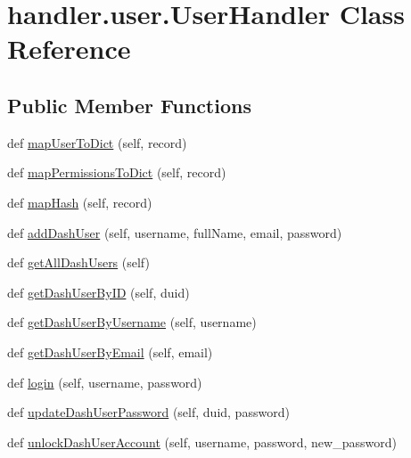 \hypertarget{classhandler_1_1user_1_1_user_handler}{}\section{handler.\+user.\+User\+Handler Class Reference}
\label{classhandler_1_1user_1_1_user_handler}
\subsection*{Public Member Functions}
\begin{DoxyCompactItemize}
\item 
def \hyperlink{classhandler_1_1user_1_1_user_handler_a563bf510a65aefcc2d6988d18fce087f}{map\+User\+To\+Dict} (self, record)
\item 
def \hyperlink{classhandler_1_1user_1_1_user_handler_a68a4fcf8939d84849aa4b6bb63d25a65}{map\+Permissions\+To\+Dict} (self, record)
\item 
def \hyperlink{classhandler_1_1user_1_1_user_handler_a6bebccaf5fa86ff02d81c65bff29ec87}{map\+Hash} (self, record)
\item 
def \hyperlink{classhandler_1_1user_1_1_user_handler_a3d1e4cb462752aa66af5950b89c1feed}{add\+Dash\+User} (self, username, full\+Name, email, password)
\item 
def \hyperlink{classhandler_1_1user_1_1_user_handler_a7fcf1c2f61bb89c83536a0066d089de1}{get\+All\+Dash\+Users} (self)
\item 
def \hyperlink{classhandler_1_1user_1_1_user_handler_a8496fb014da7425079e6a2c02a5b6af6}{get\+Dash\+User\+By\+ID} (self, duid)
\item 
def \hyperlink{classhandler_1_1user_1_1_user_handler_a70ef6b477b3320b72ffdd736df0f0f96}{get\+Dash\+User\+By\+Username} (self, username)
\item 
def \hyperlink{classhandler_1_1user_1_1_user_handler_ae8de510893a8c86cc173b55739143368}{get\+Dash\+User\+By\+Email} (self, email)
\item 
def \hyperlink{classhandler_1_1user_1_1_user_handler_a83f742752a1b3d3bbf68c3cabc877f3c}{login} (self, username, password)
\item 
def \hyperlink{classhandler_1_1user_1_1_user_handler_a56eaeae0434a67f7d99f4d7c670afdc9}{update\+Dash\+User\+Password} (self, duid, password)
\item 
def \hyperlink{classhandler_1_1user_1_1_user_handler_aa2de9a5da6421296215e75fafeb9b9d4}{unlock\+Dash\+User\+Account} (self, username, password, new\+\_\+password)

\end{DoxyCompactItemize}
